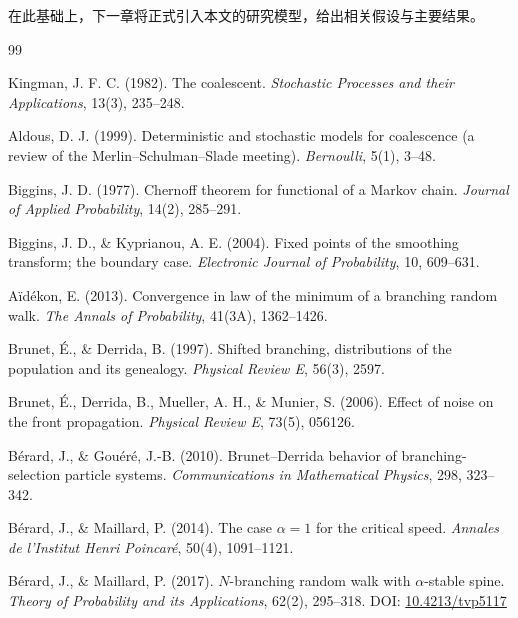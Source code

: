 在此基础上，下一章将正式引入本文的研究模型，给出相关假设与主要结果。

\begin{thebibliography}{99}
\small

Kingman, J. F. C. (1982). The coalescent. \textit{Stochastic Processes and their Applications}, 13(3), 235--248.

Aldous, D. J. (1999). Deterministic and stochastic models for coalescence (a review of the Merlin--Schulman--Slade meeting). \textit{Bernoulli}, 5(1), 3--48.

Biggins, J. D. (1977). Chernoff theorem for functional of a Markov chain. \textit{Journal of Applied Probability}, 14(2), 285--291.

Biggins, J. D., \& Kyprianou, A. E. (2004). Fixed points of the smoothing transform; the boundary case. \textit{Electronic Journal of Probability}, 10, 609--631.

Aïdékon, E. (2013). Convergence in law of the minimum of a branching random walk. \textit{The Annals of Probability}, 41(3A), 1362--1426.

Brunet, \'{E}., \& Derrida, B. (1997). Shifted branching, distributions of the population and its genealogy. \textit{Physical Review E}, 56(3), 2597.

Brunet, \'{E}., Derrida, B., Mueller, A. H., \& Munier, S. (2006). Effect of noise on the front propagation. \textit{Physical Review E}, 73(5), 056126.

Bérard, J., \& Gouéré, J.-B. (2010). Brunet--Derrida behavior of branching-selection particle systems. \textit{Communications in Mathematical Physics}, 298, 323--342.

Bérard, J., \& Maillard, P. (2014). The case $\alpha=1$ for the critical speed. \textit{Annales de l'Institut Henri Poincaré}, 50(4), 1091--1121.

Bérard, J., \& Maillard, P. (2017). $N$-branching random walk with $\alpha$-stable spine. \textit{Theory of Probability and its Applications}, 62(2), 295--318. DOI: \href{https://doi.org/10.4213/tvp5117}{10.4213/tvp5117}


\end{thebibliography}
